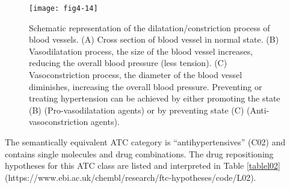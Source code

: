 \begin{figure}[ht]
    \centering
    \texttt{[image: fig4-14]}
    \caption{Schematic representation of the dilatation/constriction process of blood vessels. (A) Cross section of blood vessel in normal state. (B) Vasodilatation process, the size of the blood vessel increases, reducing the overall blood pressure (less tension). (C) Vasoconstriction process, the diameter of the blood vessel diminishes, increasing the overall blood pressure. Preventing or treating hypertension can be achieved by either promoting the state (B) (Pro-vasodilatation agents) or by preventing state (C) (Anti-vasoconstriction agents).}
    \label{fig4-14}
\end{figure}

The semantically equivalent ATC category is “antihypertensives” (C02) and contains single molecules and drug combinations. The drug repositioning hypotheses for this ATC class are listed and interpreted in Table \ref{tablel02} (https://www.ebi.ac.uk/chembl/research/ftc-hypotheses/code/L02).

